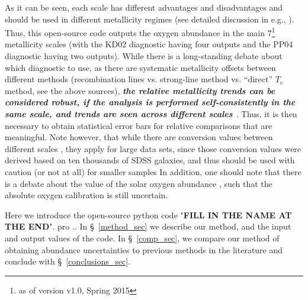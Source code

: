 \documentclass{emulateapj}
\begin{document}
As it can be seen, each scale has different advantages and disadvantages and should be used in different metallicity regimes (see detailed discussion in e.g.,  \citealt{kewley02,stasinska02,kewley08,moustakas10,lopezsanchez12,dopita13,blanc15}). Thus, this open-source code outputs the oxygen abundance in the main 7\footnote{as of version v1.0, Spring 2015} metallicity scales (with the KD02 diagnostic having four outputs and the PP04 diagnostic having two outputs). While there is a long-standing debate about which diagnostic to use, as there are systematic metallicity offsets between different methods (recombination lines vs. strong-line method vs. ``direct'' $T_e$ method, see the above sources), \emph{\bf the relative metallicity trends can be considered robust, if the analysis is performed self-consistently in the same scale, and trends are seen across different scales \citep{kewley08,moustakas10}}. Thus, it is then necessary to obtain statistical error bars for relative comparisons that are meaningful. Note however, that while there are conversion values between different scales \citep{kewley08}, they apply for large data sets, since those conversion values were derived based on ten thousands of SDSS galaxies, and thus should be used with caution (or not at all) for smaller samples
In addition, one should note that there is a debate about the value of the solar oxygen abundance \citep{asplund09_rev,chaffau11}, such that the absolute oxygen calibration is still uncertain.



Here we introduce the open-source python code "\textbf{FILL IN THE NAME AT THE END}". pro .. In \S~\ref{method_sec} we describe our method, and the input and output values of the code. In \S~\ref{comp_sec}, we compare our method of obtaining abundance uncertainties to previous methods in the literature and conclude with \S~\ref{conclusions_sec}. 

\end{document}
